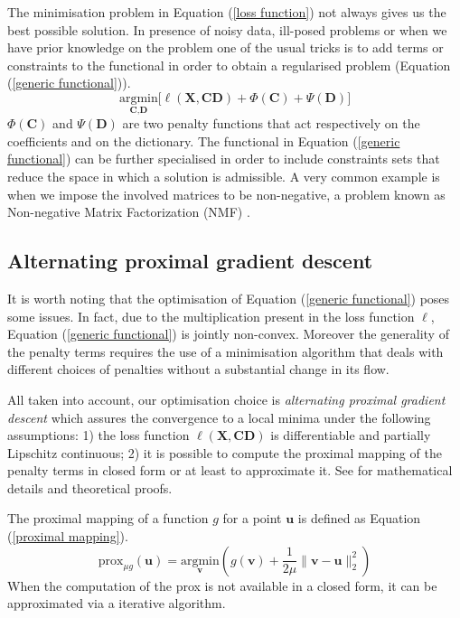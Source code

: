 \documentclass[a4paper,UKenglish]{oasics}
\begin{document}
The minimisation problem in Equation (\ref{loss function}) not always gives us the best possible solution. In presence of noisy data, ill-posed problems or when we have prior knowledge on the problem one of the usual tricks is to add terms or constraints to the functional in order to obtain a regularised problem (Equation (\ref{generic functional})).
%
\begin{equation}\label{generic functional}
\underset{\textbf{C}, \textbf{D}}{\text{argmin}} \bigg[ \ell(\textbf{X}, \textbf{CD}) + \Phi(\textbf{C}) + \Psi(\textbf{D}) \bigg]
\end{equation}
$\Phi(\textbf{C})$  and $\Psi(\textbf{D})$ are two penalty functions that act respectively on the coefficients and on the dictionary.
The functional in Equation (\ref{generic functional}) can be further specialised in order to include constraints sets that reduce the space in which a solution is admissible. A very common example is when we impose the involved matrices to be non-negative, a problem known as Non-negative Matrix Factorization (NMF) \cite{lee1999learning}.
%
%
\subsection{Alternating proximal gradient descent}
It is worth noting that the optimisation of Equation (\ref{generic functional}) poses some issues. In fact, due to the multiplication present in the loss function $\ell$, Equation (\ref{generic functional}) is jointly non-convex. Moreover the generality of the penalty terms requires the use of a minimisation algorithm that deals with different choices of penalties without a substantial change in its flow.

All taken into account, our optimisation choice is \emph{alternating proximal gradient descent} \cite{bolte2014proximal} which assures the convergence to a local minima under the following assumptions: 1) the loss function $\ell(\textbf{X}, \textbf{C}\textbf{D})$  is differentiable and partially Lipschitz continuous; 2) it is possible to compute the proximal mapping of the penalty terms in closed form or at least to approximate it. See \cite{bolte2014proximal} for mathematical details and theoretical proofs.

The proximal mapping \cite{parikh2014proximal} of a function $g$ for a point $\textbf{u}$ is defined as Equation (\ref{proximal mapping}).
\begin{equation}\label{proximal mapping}
\text{prox}_{\mu g}(\textbf{u}) = \underset{\textbf{v}}{\text{argmin}}\left(g(\textbf{v}) + \frac{1}{2\mu}\parallel\textbf{v} - \textbf{u}\parallel_2^2\right)
\end{equation}
When the computation of the prox is not available in a closed form, it can be approximated via a iterative algorithm.
\end{document}
